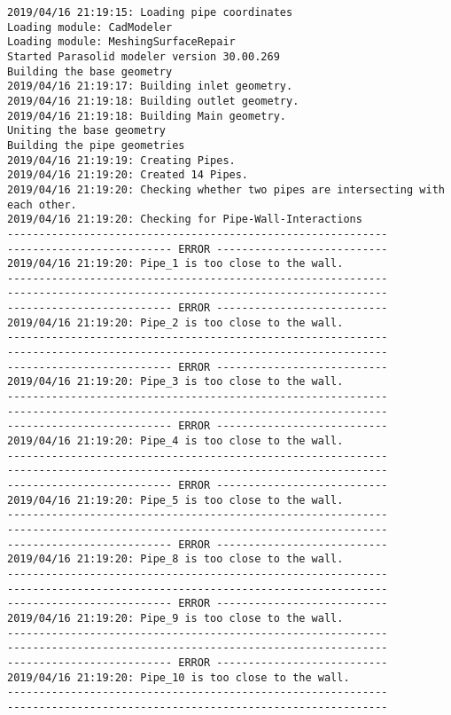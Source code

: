 \documentclass{article}
\begin{document}
{\tiny 
\begin{verbatim}
2019/04/16 21:19:15: Loading pipe coordinates
Loading module: CadModeler
Loading module: MeshingSurfaceRepair
Started Parasolid modeler version 30.00.269
Building the base geometry
2019/04/16 21:19:17: Building inlet geometry.
2019/04/16 21:19:18: Building outlet geometry.
2019/04/16 21:19:18: Building Main geometry.
Uniting the base geometry
Building the pipe geometries
2019/04/16 21:19:19: Creating Pipes.
2019/04/16 21:19:20: Created 14 Pipes.
2019/04/16 21:19:20: Checking whether two pipes are intersecting with each other.
2019/04/16 21:19:20: Checking for Pipe-Wall-Interactions
------------------------------------------------------------
-------------------------- ERROR ---------------------------
2019/04/16 21:19:20: Pipe_1 is too close to the wall.
------------------------------------------------------------
------------------------------------------------------------
-------------------------- ERROR ---------------------------
2019/04/16 21:19:20: Pipe_2 is too close to the wall.
------------------------------------------------------------
------------------------------------------------------------
-------------------------- ERROR ---------------------------
2019/04/16 21:19:20: Pipe_3 is too close to the wall.
------------------------------------------------------------
------------------------------------------------------------
-------------------------- ERROR ---------------------------
2019/04/16 21:19:20: Pipe_4 is too close to the wall.
------------------------------------------------------------
------------------------------------------------------------
-------------------------- ERROR ---------------------------
2019/04/16 21:19:20: Pipe_5 is too close to the wall.
------------------------------------------------------------
------------------------------------------------------------
-------------------------- ERROR ---------------------------
2019/04/16 21:19:20: Pipe_8 is too close to the wall.
------------------------------------------------------------
------------------------------------------------------------
-------------------------- ERROR ---------------------------
2019/04/16 21:19:20: Pipe_9 is too close to the wall.
------------------------------------------------------------
------------------------------------------------------------
-------------------------- ERROR ---------------------------
2019/04/16 21:19:20: Pipe_10 is too close to the wall.
------------------------------------------------------------
------------------------------------------------------------

\end{verbatim}}
\end{document}
